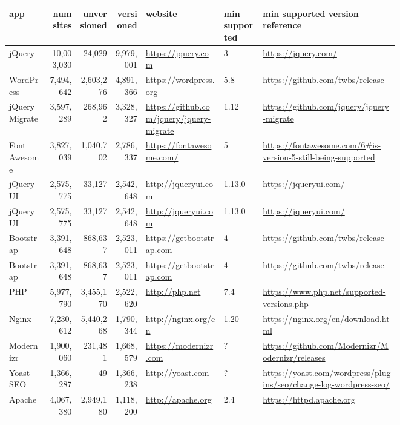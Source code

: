 \setlength\LTleft{-2cm}
\begin{landscape}
	\begin{longtable}{|p{0.1\linewidth}|r|r|r|p{0.2\linewidth}|p{0.1\linewidth}|p{0.35\linewidth}|}
		
		\hline
		app &num sites &unversioned  &versioned  &website &min supported
		&min supported version reference \\\hline
		jQuery &10,003,030 &24,029 &9,979,001 &\url{https://jquery.com} &3 &\url{https://jquery.com/} \\\hline
		WordPress &7,494,642 &2,603,276 &4,891,366 &\url{https://wordpress.org} &5.8 &\url{https://github.com/twbs/release} \\\hline
		jQuery Migrate &3,597,289 &268,962 &3,328,327 &\url{https://github.com/jquery/jquery-migrate} &1.12 &\url{https://github.com/jquery/jquery-migrate} \\\hline
		Font Awesome &3,827,039 &1,040,702 &2,786,337 &\url{https://fontawesome.com/} &5 &\url{https://fontawesome.com/6\#is-version-5-still-being-supported} \\\hline
		jQuery UI &2,575,775 &33,127 &2,542,648 &\url{http://jqueryui.com} &1.13.0 &\url{https://jqueryui.com/} \\\hline
		jQuery UI &2,575,775 &33,127 &2,542,648 &\url{http://jqueryui.com} &1.13.0 &\url{https://jqueryui.com/} \\\hline
		Bootstrap &3,391,648 &868,637 &2,523,011 &\url{https://getbootstrap.com} &4 &\url{https://github.com/twbs/release} \\\hline
		Bootstrap &3,391,648 &868,637 &2,523,011 &\url{https://getbootstrap.com} &4 &\url{https://github.com/twbs/release} \\\hline
		PHP &5,977,790 &3,455,170 &2,522,620 &\url{http://php.net} &7.4 &\url{https://www.php.net/supported-versions.php} \\\hline
		Nginx &7,230,612 &5,440,268 &1,790,344 &\url{http://nginx.org/en} &1.20 &\url{https://nginx.org/en/download.html} \\\hline
		Modernizr &1,900,060 &231,481 &1,668,579 &\url{https://modernizr.com} &? &\url{https://github.com/Modernizr/Modernizr/releases} \\\hline
		Yoast SEO &1,366,287 &49 &1,366,238 &\url{http://yoast.com} &? &\url{https://yoast.com/wordpress/plugins/seo/change-log-wordpress-seo/} \\\hline
		Apache &4,067,380 &2,949,180 &1,118,200 &\url{http://apache.org} &2.4 &\url{https://httpd.apache.org} \\\hline

\end{longtable}
\end{landscape}
